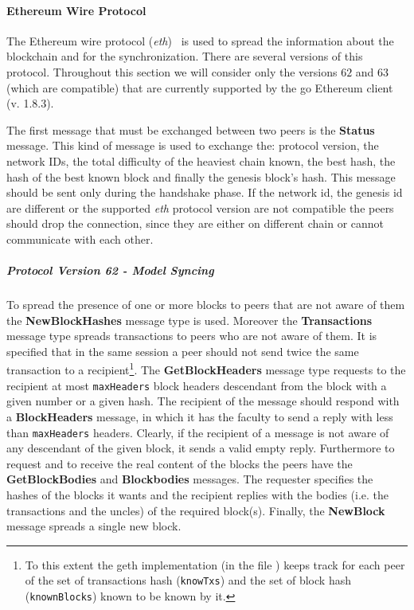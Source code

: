 \paragraph{Ethereum Wire Protocol}
The Ethereum wire protocol
(\textit{eth})~\cite{bib:ethereumwireprotocol} is used to spread the information
about the blockchain and for the synchronization. There are several versions
of this protocol. Throughout this section we will consider only the versions
$62$ and $63$ (which are compatible) that are currently supported by the go
Ethereum client (v. 1.8.3).

The first message that must be exchanged between two peers
is the \textbf{Status} message. This kind of message is used to exchange
the: protocol version, the network IDs, the total difficulty of the
heaviest chain known, the best hash, the hash of the best known block and
finally the genesis block's hash. This message should be sent only during
the handshake phase.
If the network id, the genesis id are different or the supported
\textit{eth} protocol version are not compatible the peers should
drop the connection, since they are either on different chain or cannot
communicate with each other.

\subparagraph{Protocol Version 62 - Model Syncing}
To spread the presence of one or more blocks to peers that are not aware
of them the \textbf{NewBlockHashes} message type is used.
Moreover the \textbf{Transactions} message type spreads transactions to
peers who are not aware of them. It is specified that
in the same session a peer should not send twice the same
transaction to a
recipient\footnote{To this extent the
geth implementation (in the file ) keeps track for each
peer of the set of transactions hash (\texttt{knowTxs}) and the set of
block hash (\texttt{knownBlocks}) known to be known by it.}.
The \textbf{GetBlockHeaders} message type requests to the recipient at most
\texttt{maxHeaders} block headers descendant from the block with a given
number or a given hash.
The recipient of the message should respond with a \textbf{BlockHeaders}
message, in which it has the faculty to send a reply with less than
\texttt{maxHeaders} headers. Clearly, if the recipient of a message
is not aware of any descendant of the given block, it sends a valid empty
reply. Furthermore to request and to receive the real content of the blocks the
peers have the \textbf{GetBlockBodies} and \textbf{Blockbodies} messages.
The requester specifies the hashes of the blocks it wants and the recipient
replies with the bodies (i.e. the transactions and the uncles) of
the required block(s).
Finally, the \textbf{NewBlock} message spreads a single new block.

